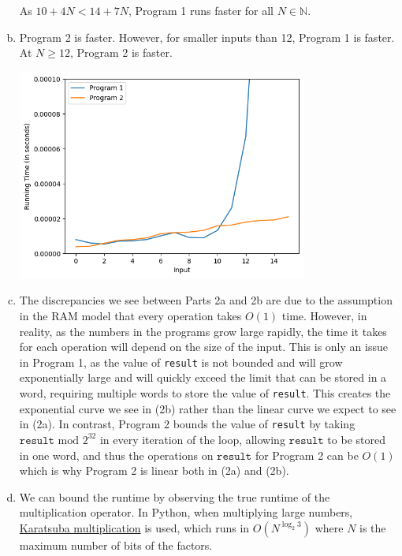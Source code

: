\documentclass[11pt]{scrartcl}
\theoremstyle{dotlessP}
\theoremstyle{dotlessN}
\newcommand{\nats}{\mathbb{N}}
\begin{document}
\begin{enumerate}[(a)]
		As $10 + 4N < 14 + 7N$, Program 1 runs faster for all $N \in \nats$.
	\item Program 2 is faster. However, for smaller inputs than 12, Program 1 is faster. At $N \geq 12$, Program 2 is faster.
		\begin{center}
			\includegraphics[width=0.75\textwidth]{running_times.png}
		\end{center}
	\item The discrepancies we see between Parts 2a and 2b are due to the assumption in the RAM model that every operation takes $O(1)$ time. However, in reality, as the numbers in the programs grow large rapidly, the time it takes for each operation will depend on the size of the input. This is only an issue in Program 1, as the value of \texttt{result} is not bounded and will grow exponentially large and will quickly exceed the limit that can be stored in a word, requiring multiple words to store the value of \texttt{result}. This creates the exponential curve we see in (2b) rather than the linear curve we expect to see in (2a). In contrast, Program 2 bounds the value of \texttt{result} by taking $\texttt{result}\text{ mod }{2^{32}}$ in every iteration of the loop, allowing $\texttt{result}$ to be stored in one word, and thus the operations on $\texttt{result}$ for Program 2 can be $O(1)$ which is why Program 2 is linear both in (2a) and (2b).
	\item We can bound the runtime by observing the true runtime of the multiplication operator. In Python, when multiplying large numbers, \href{https://hg.python.org/cpython/file/b514339e41ef/Objects/longobject.c#l2694}{Karatsuba multiplication} is used, which runs in \href{https://brilliant.org/wiki/karatsuba-algorithm/#:~:text=Using%20the%20master%20theorem%20on,%E2%89%88%20%CE%98%20(%20n%201.585%20)%20.}{$O(N^{\log_{2}3})$} where $N$ is the maximum number of bits of the factors.
		\\


\end{enumerate}
\end{document}
